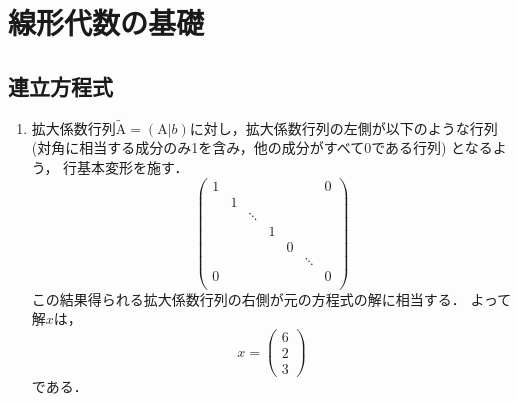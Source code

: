 \section{線形代数の基礎}

\subsection{連立方程式}
  \vspace{1mm}
  \begin{enumerate}[label=(\roman*)]
    \item
    拡大係数行列$\tilde{\mathrm{A}} = (\mathrm{A}|b)$に対し，拡大係数行列の左側が以下のような行列
    (対角に相当する成分のみ1を含み，他の成分がすべて0である行列) となるよう，
    行基本変形を施す．
    \begin{equation}
      \left(
        \begin{array}{rrrrrrr}
          1 &   &        &   &   &        & 0 \\
            & 1 &        &   &   &        &   \\
            &   & \ddots &   &   &        &   \\
            &   &        & 1 &   &        &   \\
            &   &        &   & 0 &        &   \\
            &   &        &   &   & \ddots &   \\
          0 &   &        &   &   &        & 0 \\
        \end{array}
      \right)
    \end{equation}
    この結果得られる拡大係数行列の右側が元の方程式の解に相当する．
    よって解$x$は，
    \begin{equation}
      x = \left(
        \begin{array}{r}
          6 \\ 2 \\ 3
        \end{array}
        \right)
    \end{equation}
    である．
    

\end{enumerate}
